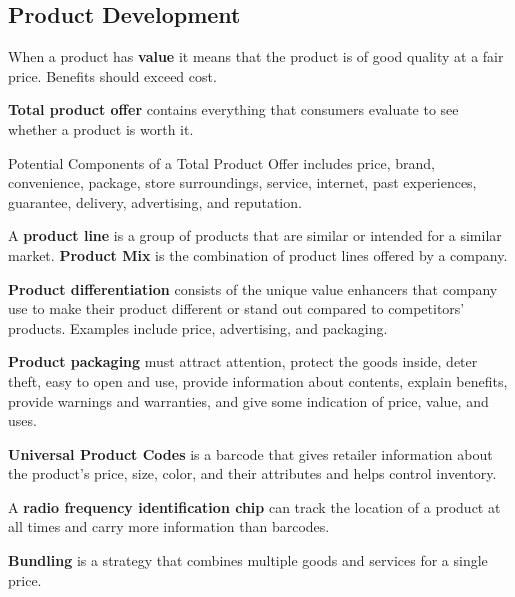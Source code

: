 \documentclass[english, 12pt]{article}
\begin{document}
\subsection{Product Development}
\begin{defn}
When a product has \textbf{value} it means that the product is of good quality at a fair price. Benefits should exceed cost.
\end{defn}
\begin{defn}
\textbf{Total product offer} contains everything that consumers evaluate to see whether a product is worth it.
\end{defn}
\begin{exmp}
Potential Components of a Total Product Offer includes price, brand, convenience, package, store surroundings, service, internet, past experiences, guarantee, delivery, advertising, and reputation.
\end{exmp}
\begin{defn}
A \textbf{product line} is a group of products that are similar or intended for a similar market. \textbf{Product Mix} is the combination of product lines offered by a company.
\end{defn}
\begin{defn}
\textbf{Product differentiation} consists of the unique value enhancers that company use to make their product different or stand out compared to competitors' products. Examples include price, advertising, and packaging.
\end{defn}
\begin{exmp}
\textbf{Product packaging} must attract attention, protect the goods inside, deter theft, easy to open and use, provide information about contents, explain benefits, provide warnings and warranties, and give some indication of price, value, and uses.
\end{exmp}
\begin{exmp}
\textbf{Universal Product Codes} is a barcode that gives retailer information about the product's price, size,  color, and their attributes and helps control inventory.
\end{exmp}
\begin{exmp}
A \textbf{radio frequency identification chip} can track the location of a product at all times and carry more information than barcodes.
\end{exmp}
\begin{exmp}
\textbf{Bundling} is a strategy that combines multiple goods and services for a single price.
\end{exmp}
\end{document}
